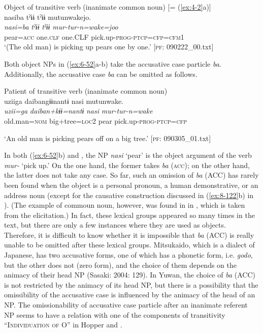 \begin{table}
\ex Object of transitive verb (inanimate common noun) [= (\ref{ex:4-2}a)]\\
{\TM}
\glll  nasiba  tˀɨɨ  tˀɨɨ  mutunwakejo.\\
\textit{nasi=ba}  \textit{tˀɨɨ}  \textit{tˀɨɨ}  \textit{mur-tur-n=wake=joo}\\
pear=\textsc{acc}  one.\textsc{clf}  one.CLF  pick.up-\textsc{prog}-\textsc{ptcp}=\textsc{cfp}=\textsc{cfm}1\\
\glt ‘(The old man) is picking up pears one by one.’ [\textsc{pf}: 090222\_00.txt]
\z

Both object NPs in (\ref{ex:6-52}a-b) take the accusative case particle \textit{ba}. Additionally, the accusative case \textit{ba} can be omitted as follows.

\ea\label{ex:6-53}
 Patient of transitive verb (inanimate common noun)\\

{\TM}
\glll uziiga  daibangɨɨnantɨ  nasi  mutunwake.\\
\textit{uzii=ga}  \textit{daiban+kɨɨ=nantɨ}  \textit{nasi}  \textit{mur-tur-n=wake}\\

    old.man=\textsc{nom}  big+tree=\textsc{loc}2  pear  pick.up-\textsc{prog}-\textsc{ptcp}=\textsc{cfp}

\glt    ‘An old man is picking pears off on a big tree.’ [\textsc{pf}: 090305\_01.txt]
\z

In both (\ref{ex:6-52}b) and , the NP \textit{nasi} ‘pear’ is the object argument of the verb \textit{mur-} ‘pick up.’ On the one hand, the former takes \textit{ba} (\textsc{acc}); on the other hand, the latter does not take any case. So far, such an omission of \textit{ba} (ACC) has rarely been found when the object is a personal pronoun, a human demonstrative, or an address noun (except for the causative construction discussed in (\ref{ex:8-122}b) in ). (The example of commoun noun, however, was found in  in , which is taken from the elicitation.) In fact, these lexical groups appeared so many times in the text, but there are only a few instances where they are used as objects. Therefore, it is difficult to know whether it is impossible that \textit{ba} (ACC) is really unable to be omitted after these lexical groups. Mitsukaido, which is a dialect of Japanese, has two accusative forms, one of which has a phonetic form, i.e. \textit{godo}, but the other does not (zero form), and the choice of them depends on the animacy of their head NP (Sasaki: 2004: 129). In Yuwan, the choice of \textit{ba} (ACC) is not restricted by the animacy of its head NP, but there is a possibility that the omissibility of the accusative case is influenced by the animacy of the head of an NP. The omissionability of accusative case particle after an inanimate referent NP seems to have a relation with one of the components of transitivity “I\textsc{ndividuation} \textsc{of} O” in Hopper and \citet[252]{Thompson1980}.


\end{table}
